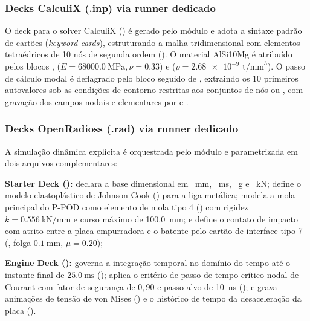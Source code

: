\subsubsection{Decks CalculiX (.inp) via runner dedicado}
\label{subsubsec:calculix}
O deck para o solver CalculiX () é gerado pelo módulo  e adota a sintaxe padrão de cartões (\textit{keyword cards}), estruturando a malha tridimensional com elementos tetraédricos de 10 nós de segunda ordem (). O material AlSi10Mg é atribuído pelos blocos ,  ($E = \SI{68000.0}{\mega\pascal}, \nu = \num{0.33}$) e  ($\rho = \num{2.68e-9}\text{ t/mm}^3$). O passo de cálculo modal é deflagrado pelo bloco  seguido de , extraindo os 10 primeiros autovalores sob as condições de contorno  restritas aos conjuntos de nós  ou , com gravação dos campos nodais e elementares por  e .

\subsubsection{Decks OpenRadioss (.rad) via runner dedicado}
\label{subsubsec:openradioss}
A simulação dinâmica explícita é orquestrada pelo módulo  e parametrizada em dois arquivos complementares:
\begin{alineas}
  \item \textbf{Starter Deck ():} declara a base dimensional em \SI{}{\milli\metre}, \SI{}{\milli\second}, \SI{}{\gram} e \SI{}{\kilo\newton}; define o modelo elastoplástico de Johnson-Cook () para a liga metálica; modela a mola principal do P-POD como elemento de mola tipo 4 () com rigidez $k = \SI{0.556}{\kilo\newton\per\milli\metre}$ e curso máximo de \SI{100.0}{\milli\metre}; e define o contato de impacto com atrito entre a placa empurradora e o batente pelo cartão de interface tipo 7 (, folga $\SI{0.1}{\milli\metre}$, $\mu = \num{0.20}$);
  \item \textbf{Engine Deck ():} governa a integração temporal no domínio do tempo até o instante final de $\SI{25.0}{\milli\second}$ (); aplica o critério de passo de tempo crítico nodal de Courant com fator de segurança de $0{,}90$ e passo alvo de \SI{10}{\nano\second} (); e grava animações de tensão de von Mises () e o histórico de tempo da desaceleração da placa ().
\end{alineas}

